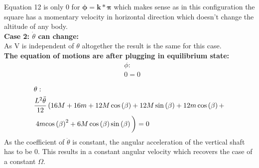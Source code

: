 \noindent Equation 12 is only 0 for $\boldsymbol{\phi = k*\pi}$ which makes sense as in this configuration the square has a momentary velocity in horizontal direction which doesn't change the altitude of any body.\vspace{0.5cm}\\

\textbf{Case 2: $\dot\theta$ can change:} \vspace{0.3cm}\\

As V is independent of $\theta$ altogether the result is the same for this case.\vspace{3mm}\\

\noindent \textbf{The equation of motions are after plugging in equilibrium state:}\vspace{3mm}\\


\begin{equation}
    \begin{split}
        &\phi:\\
        &0 = 0
    \end{split}
\end{equation}

\begin{equation}
    \begin{split}
        &\theta:\\
        &\frac{L^2\mathrm{\ddot\theta}}{12}\left(16M+16m+12M\cos\left(\beta \right)+12M\sin\left(\beta \right)+12m\cos\left(\beta \right)+\right.\\
        &\left.4m{\cos\left(\beta \right)}^2+6M\cos\left(\beta \right)\sin\left(\beta \right)\vphantom{\int_1^2}\right) = 0
    \end{split}
\end{equation}
As the coefficient of $\ddot\theta$ is constant, the angular acceleration of the vertical shaft has to be 0. This results in a constant angular velocity which recovers the case of a constant $\Omega$.



    


